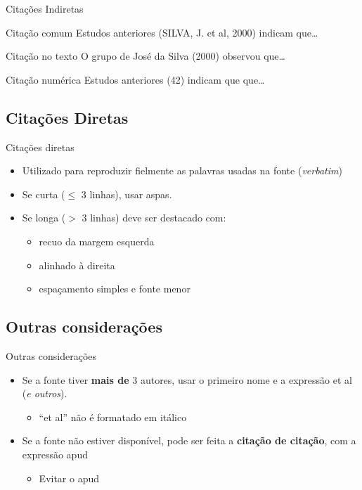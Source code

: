 \documentclass{beamer}
\begin{document}
\begin{frame}{Citações Indiretas}
  \begin{exampleblock}{Citação comum}
    Estudos anteriores \alert{(SILVA, J. et al, 2000)} indicam
    que\ldots
  \end{exampleblock}
  \bigskip
  \begin{exampleblock}{Citação no texto}
    O grupo de José da Silva \alert{(2000)} observou que\ldots
  \end{exampleblock}
  \bigskip
  \begin{exampleblock}{Citação numérica}
    Estudos anteriores \alert{(42)} indicam que que\ldots
  \end{exampleblock}
\end{frame}

\subsection{Citações Diretas}

\begin{frame}{Citações diretas}
  \begin{itemize}
    \footnotesize
  \item Utilizado para reproduzir fielmente as palavras usadas na
    fonte ({\em verbatim})
    \bigskip
  \item Se curta ($\leq$ 3 linhas), usar aspas.
    \bigskip
  \item Se longa ($>$ 3 linhas) deve ser destacado com:
    \begin{itemize}
      \scriptsize
    \item recuo da margem esquerda
    \item alinhado à direita
    \item espaçamento simples e fonte menor
    \end{itemize}
  \end{itemize}
\end{frame}

\subsection{Outras considerações}

\begin{frame}{Outras considerações}
  \begin{itemize}
    \footnotesize
  \item Se a fonte tiver {\bf mais de} 3 autores, usar o primeiro nome
    e a expressão \alert{et al} ({\em e outros}).
    \begin{itemize}
    \item ``et al'' não é formatado em itálico
    \end{itemize}
    \bigskip
  \item Se a fonte não estiver disponível, pode ser feita a {\bf
      citação de citação}, com a expressão \alert{apud}
    \begin{itemize}
    \item Evitar o apud
    \end{itemize}
  \end{itemize}
\end{frame}
\end{document}
